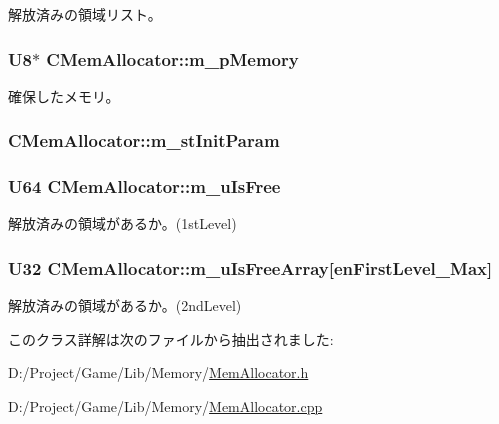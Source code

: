 解放済みの領域リスト。 

\hypertarget{class_c_mem_allocator_ad729846ce9ff5ecdac69574604140e39}{}
\subsubsection[{m\+\_\+p\+Memory}]{\setlength{\rightskip}{0pt plus 5cm}U8$\ast$ C\+Mem\+Allocator\+::m\+\_\+p\+Memory\hspace{0.3cm}{\ttfamily [private]}}\label{class_c_mem_allocator_ad729846ce9ff5ecdac69574604140e39}


確保したメモリ。 

\hypertarget{class_c_mem_allocator_a5ae9573631f11b58cb0741dd5d071d4e}{}
\subsubsection[{m\+\_\+st\+Init\+Param}]{ C\+Mem\+Allocator\+::m\+\_\+st\+Init\+Param\hspace{0.3cm}{\ttfamily [private]}}\label{class_c_mem_allocator_a5ae9573631f11b58cb0741dd5d071d4e}
\hypertarget{class_c_mem_allocator_a9f35f48a378b79fc033b6aa6dcf13b73}{}
\subsubsection[{m\+\_\+u\+Is\+Free}]{\setlength{\rightskip}{0pt plus 5cm}U64 C\+Mem\+Allocator\+::m\+\_\+u\+Is\+Free\hspace{0.3cm}{\ttfamily [private]}}\label{class_c_mem_allocator_a9f35f48a378b79fc033b6aa6dcf13b73}


解放済みの領域があるか。(1st\+Level) 

\hypertarget{class_c_mem_allocator_a6fc0c334bf8f88d108b7f7ca1b87c682}{}
\subsubsection[{m\+\_\+u\+Is\+Free\+Array}]{\setlength{\rightskip}{0pt plus 5cm}U32 C\+Mem\+Allocator\+::m\+\_\+u\+Is\+Free\+Array\mbox{[}{\bf en\+First\+Level\+\_\+\+Max}\mbox{]}\hspace{0.3cm}{\ttfamily [private]}}\label{class_c_mem_allocator_a6fc0c334bf8f88d108b7f7ca1b87c682}


解放済みの領域があるか。(2nd\+Level) 



このクラス詳解は次のファイルから抽出されました\+:\begin{DoxyCompactItemize}
\item 
D\+:/\+Project/\+Game/\+Lib/\+Memory/\hyperlink{_mem_allocator_8h}{Mem\+Allocator.\+h}\item 
D\+:/\+Project/\+Game/\+Lib/\+Memory/\hyperlink{_mem_allocator_8cpp}{Mem\+Allocator.\+cpp}\end{DoxyCompactItemize}
